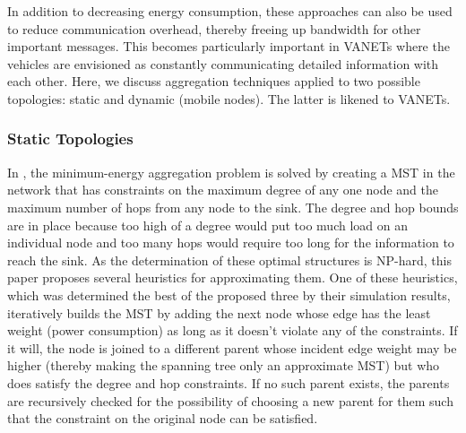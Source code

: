 \documentclass{IEEEtran}
\begin{document}
In addition to decreasing energy consumption, these approaches can also be used to reduce communication overhead, thereby freeing up bandwidth for other important messages.
This becomes particularly important in VANETs where the vehicles are envisioned as constantly communicating detailed information with each other.
Here, we discuss aggregation techniques applied to two possible topologies: static and dynamic (mobile nodes).  The latter is likened to VANETs.

\subsubsection{Static Topologies}

In \cite{heuristic}, the minimum-energy aggregation problem is solved by creating a MST in the network that has constraints on the maximum degree of any one node and the maximum number of hops from any node to the sink.  The degree and hop bounds are in place because too high of a degree would put too much load on an individual node and too many hops would require too long for the information to reach the sink.
As the determination of these optimal structures is NP-hard, this paper proposes several heuristics for approximating them.  One of these heuristics, which was determined the best of the proposed three by their simulation results, iteratively builds the MST by adding the next node whose edge has the least weight (power consumption) as long as it doesn’t violate any of the constraints.
If it will, the node is joined to a different parent whose incident edge weight may be higher (thereby making the spanning tree only an approximate MST) but who does satisfy the degree and hop constraints.  If no such parent exists, the parents are recursively checked for the possibility of choosing a new parent for them such that the constraint on the original node can be satisfied.
\end{document}
